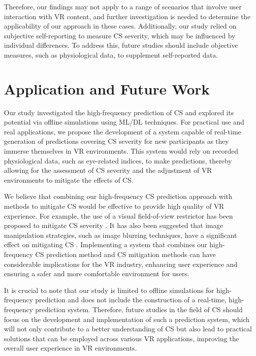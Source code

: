 \documentclass{ieeeaccess}
\begin{document}
Therefore, our findings may not apply to a range of scenarios that involve user interaction with VR content, and further investigation is needed to determine the applicability of our approach in these cases. Additionally, our study relied on subjective self-reporting to measure CS severity, which may be influenced by individual differences. To address this, future studies should include objective measures, such as physiological data, to supplement self-reported data.

\section{Application and Future Work}

Our study investigated the high-frequency prediction of CS and explored its potential via offline simulations using ML/DL techniques. For practical use and real applications, we propose the development of a system capable of real-time generation of predictions covering CS severity for new participants as they immerse themselves in VR environments. This system would rely on recorded physiological data, such as eye-related indices, to make predictions, thereby allowing for the assessment of CS severity and the adjustment of VR environments to mitigate the effects of CS.

We believe that combining our high-frequency CS prediction approach with methods to mitigate CS would be effective to provide high quality of VR experience. For example, the use of a visual field-of-view restrictor has been proposed to mitigate CS severity \cite{Fernandes_2016, Kala_2017, Kim_2_2019, Zayer_2019}. It has also been suggested that image manipulation strategies, such as image blurring techniques, have a significant effect on mitigating CS \cite{Budhiraja_2017, Qionghua_2019, Nie_2020}. Implementing a system that combines our high-frequency CS prediction method and CS mitigation methods can have considerable implications for the VR industry, enhancing user experience and ensuring a safer and more comfortable environment for users.

It is crucial to note that our study is limited to offline simulations for high-frequency prediction and does not include the construction of a real-time, high-frequency prediction system. Therefore, future studies in the field of CS should focus on the development and implementation of such a prediction system, which will not only contribute to a better understanding of CS but also lead to practical solutions that can be employed across various VR applications, improving the overall user experience in VR environments.
\end{document}
